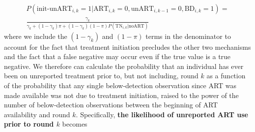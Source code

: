 \documentclass{article}[11pt]
\begin{document}
\begin{equation}
\begin{split}
P(\text{init-unART}_{i,k}=1|\text{ART}_{i,k}=0,\text{unART}_{i,k-1}=0, \text{BD}_{i,k}=1) = \\
\frac{\gamma_k}{\gamma_k + (1-\gamma_k)\pi + (1-\gamma_k)(1-\pi)P(\text{TN}_{i,k}|\text{noART})}
\end{split}
\end{equation}
where we include the $(1-\gamma_k)$ and $(1-\pi)$ terms in the denominator to account for the fact that treatment initiation precludes the other two mechanisms and the fact that a false negative may occur even if the true value is a true negative. We therefore can calculate the probability that an individual has ever been on unreported treatment prior to, but not including, round $k$ as a function of the probability that any single below-detection observation since ART was made available was not due to treatment initiation, raised to the power of the number of below-detection observations between the beginning of ART availability and round $k$. Specifically, \textbf{the likelihood of unreported ART use prior to round $k$} becomes
\end{document}
